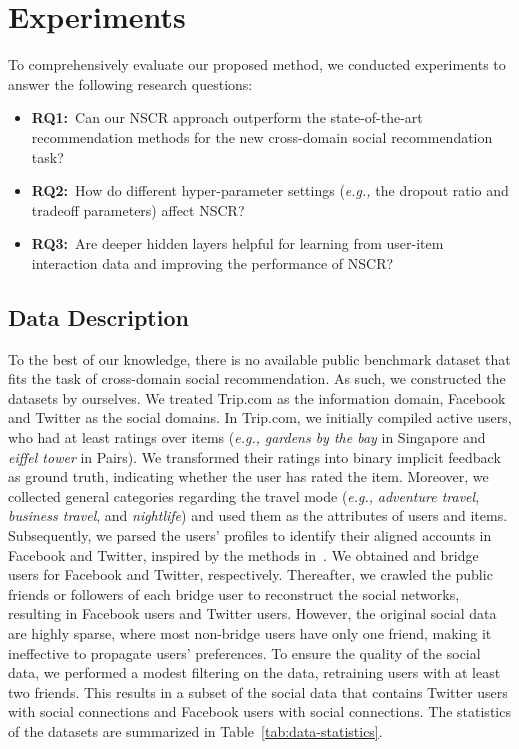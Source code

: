 \documentclass[sigconf]{acmart}
\newcommand{\eg}{\emph{e.g., }}
\begin{document}
\section{Experiments}
\label{sec:experiments}
To comprehensively evaluate our proposed method, we conducted experiments to answer the following research questions:
\begin{itemize}[leftmargin=*]
	\item\textbf{RQ1:}~Can our NSCR approach outperform the state-of-the-art recommendation methods for the new cross-domain social recommendation task?
	\item\textbf{RQ2:}~How do different hyper-parameter settings (\eg the dropout ratio and tradeoff parameters) affect NSCR?
	\item\textbf{RQ3:}~Are deeper hidden layers helpful for learning from user-item interaction data and improving the performance of NSCR?
\end{itemize}


\subsection{Data Description}

	To the best of our knowledge, there is no available public benchmark dataset that
	fits the task of cross-domain social recommendation. As such, we constructed the datasets by ourselves. We treated Trip.com as the information domain, Facebook and Twitter as the social domains. In Trip.com, we initially compiled  active users, who had at least  ratings over  items (\eg \emph{gardens by the bay} in Singapore and \emph{eiffel tower} in Pairs). We transformed their  ratings into binary implicit feedback as ground truth, indicating whether the user has rated the item.
	Moreover, we collected  general categories regarding the travel mode (\eg \emph{adventure travel}, \emph{business travel}, and \emph{nightlife}) and used them as the attributes of users and items.
Subsequently, we parsed the users' profiles to identify their aligned accounts in Facebook and Twitter, inspired by the methods in~\cite{DBLP:series/synthesis/2016NieSC,DBLP:conf/sigir/SongNZAC15}.
	We obtained  and  bridge users for Facebook and Twitter, respectively. Thereafter, we crawled the public friends or followers of each bridge user to reconstruct the social networks, resulting in  Facebook users and  Twitter users.
	However, the original social data are highly sparse, where most non-bridge users have only one friend, making it ineffective to propagate users' preferences.
To ensure the quality of the social data,
	we performed a modest filtering on the data, retraining users with at least two friends.
This results in a subset of the social data that contains  Twitter users with  social connections and  Facebook users with  social connections. The statistics of the datasets are summarized in Table~\ref{tab:data-statistics}.
	
\end{document}
